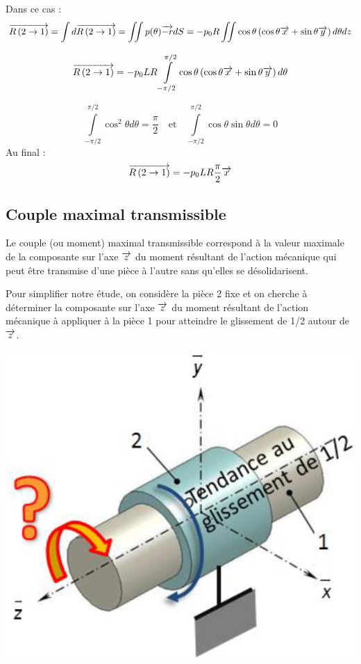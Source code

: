\documentclass[10pt,fleqn]{article} %
\begin{document}
\begin{multicols}{2}
\begin{corrige}
\end{corrige}
\else
\fi





%
\ifprof
\begin{corrige}

Dans ce cas : 
$$
\overrightarrow{R\left( {2} \rightarrow {1}\right)} = \int d\overrightarrow{R\left( {2} \rightarrow {1}\right)} = \iint p(\theta) \overrightarrow{-r} dS 
= - p_0R\iint\cos\theta  \left(\cos\theta\overrightarrow{x}+\sin\theta\overrightarrow{y} \right)  d\theta dz$$

$$
\overrightarrow{R\left( {2} \rightarrow {1}\right)} 
= - p_0 L R\int\limits_{-\pi/2}^{\pi/2}\cos\theta  \left(\cos\theta\overrightarrow{x}+\sin\theta\overrightarrow{y} \right)  d\theta$$

$$
\int\limits_{-\pi/2}^{\pi/2}\cos^2\theta  d\theta = \dfrac{\pi}{2}
\quad 
\text{et}
\quad
\int\limits_{-\pi/2}^{\pi/2}\cos\theta \sin\theta  d\theta = 0
$$
Au final :
$$
\overrightarrow{R\left( {2} \rightarrow {1}\right)} 
= - p_0 L R \dfrac{\pi}{2}\overrightarrow{x}$$
\end{corrige}
\else
\fi




\subsection*{Couple maximal transmissible}


Le couple (ou moment) maximal transmissible correspond à la valeur maximale 
de la composante sur l’axe $\overrightarrow{z}$ du moment résultant de l’action mécanique qui peut 
être transmise d’une pièce à l’autre sans qu’elles se désolidarisent. 
 
Pour simplifier notre étude, on considère la pièce 2 fixe et on cherche à 
déterminer la composante sur l’axe $\overrightarrow{z}$ du moment résultant de l’action mécanique 
à appliquer à la pièce 1 pour atteindre le glissement de 1/2 autour de $\overrightarrow{z}$.
 

\begin{center}
\includegraphics[width=.8\linewidth]{images/fig_04}
\end{center}




\end{multicols}
\end{document}
